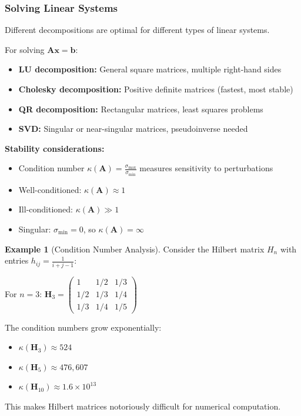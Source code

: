 \documentclass[12pt]{article}
\numberwithin{equation}{section}
\newcommand{\vect}[1]{\boldsymbol{#1}}   %
\newcommand{\mat}[1]{\mathbf{#1}}        %
\theoremstyle{plain}
\theoremstyle{definition}
\newtheorem{example}[theorem]{Example}
\theoremstyle{remark}
\begin{document}
\subsubsection{Solving Linear Systems}

Different decompositions are optimal for different types of linear systems.

\begin{algorithm}[H]
\caption{Choosing the Right Decomposition}
For solving $\mat{A}\vect{x} = \vect{b}$:

\begin{itemize}
\item \textbf{LU decomposition:} General square matrices, multiple right-hand sides
\item \textbf{Cholesky decomposition:} Positive definite matrices (fastest, most stable)
\item \textbf{QR decomposition:} Rectangular matrices, least squares problems
\item \textbf{SVD:} Singular or near-singular matrices, pseudoinverse needed
\end{itemize}

\textbf{Stability considerations:}
\begin{itemize}
\item Condition number $\kappa(\mat{A}) = \frac{\sigma_{\max}}{\sigma_{\min}}$ measures sensitivity to perturbations
\item Well-conditioned: $\kappa(\mat{A}) \approx 1$
\item Ill-conditioned: $\kappa(\mat{A}) \gg 1$
\item Singular: $\sigma_{\min} = 0$, so $\kappa(\mat{A}) = \infty$
\end{itemize}
\end{algorithm}

\begin{example}[Condition Number Analysis]
Consider the Hilbert matrix $H_n$ with entries $h_{ij} = \frac{1}{i+j-1}$:

For $n = 3$: $\mat{H}_3 = \begin{pmatrix} 1 & 1/2 & 1/3 \\ 1/2 & 1/3 & 1/4 \\ 1/3 & 1/4 & 1/5 \end{pmatrix}$

The condition numbers grow exponentially:
\begin{itemize}
\item $\kappa(\mat{H}_3) \approx 524$
\item $\kappa(\mat{H}_5) \approx 476,607$  
\item $\kappa(\mat{H}_{10}) \approx 1.6 \times 10^{13}$
\end{itemize}

This makes Hilbert matrices notoriously difficult for numerical computation.
\end{example}
\end{document}
